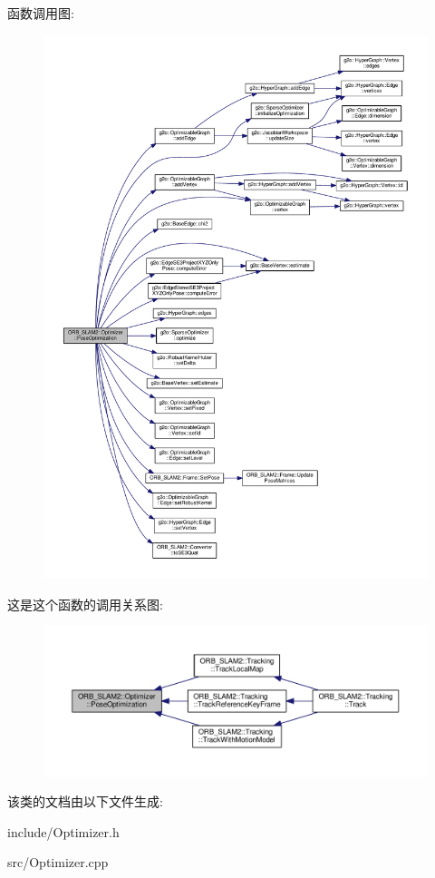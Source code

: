 函数调用图\-:
\nopagebreak
\begin{figure}[H]
\begin{center}
\leavevmode
\includegraphics[width=350pt]{classORB__SLAM2_1_1Optimizer_a7415d78b8a2323b88e108fa1ea3bf2d3_cgraph}
\end{center}
\end{figure}




这是这个函数的调用关系图\-:
\nopagebreak
\begin{figure}[H]
\begin{center}
\leavevmode
\includegraphics[width=350pt]{classORB__SLAM2_1_1Optimizer_a7415d78b8a2323b88e108fa1ea3bf2d3_icgraph}
\end{center}
\end{figure}




该类的文档由以下文件生成\-:\begin{DoxyCompactItemize}
\item 
include/Optimizer.\-h\item 
src/Optimizer.\-cpp\end{DoxyCompactItemize}
